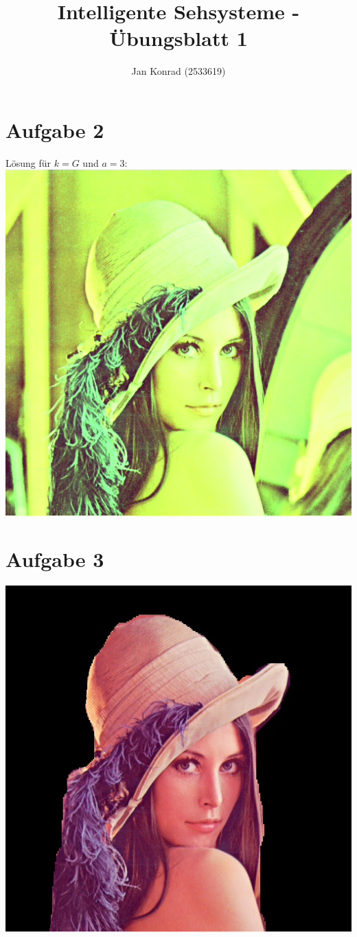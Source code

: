 \documentclass[deutsch]{llncs}
\begin{document}
\title{Intelligente Sehsysteme - Übungsblatt 1}


\author{Jan Konrad (2533619)}
\institute{}
\maketitle

\section*{Aufgabe 2}
Lösung für $k=G$ und $a=3$:\\
\includegraphics[width=\textwidth]{G3.png}

\section*{Aufgabe 3}
\includegraphics[width=\textwidth]{mask.png}
\end{document}
